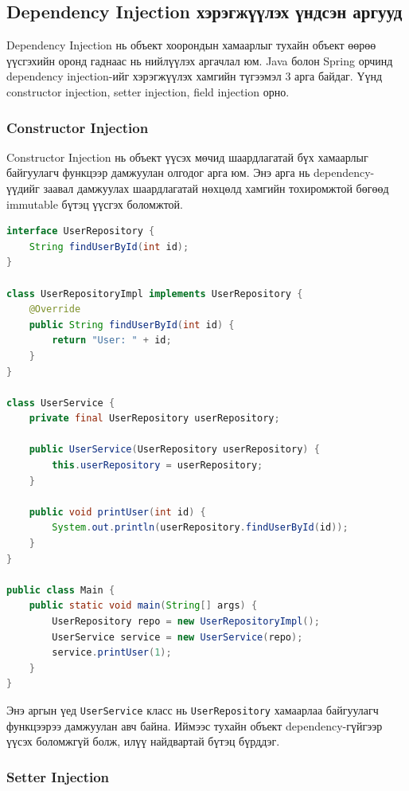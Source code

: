 \subsection{Dependency Injection хэрэгжүүлэх үндсэн аргууд}

Dependency Injection нь объект хоорондын хамаарлыг тухайн объект өөрөө үүсгэхийн оронд гаднаас нь нийлүүлэх аргачлал юм. Java болон Spring орчинд dependency injection-ийг хэрэгжүүлэх хамгийн түгээмэл 3 арга байдаг. Үүнд constructor injection, setter injection, field injection орно.

\subsubsection{Constructor Injection}

Constructor Injection нь объект үүсэх мөчид шаардлагатай бүх хамаарлыг байгуулагч функцээр дамжуулан олгодог арга юм. Энэ арга нь dependency-үүдийг заавал дамжуулах шаардлагатай нөхцөлд хамгийн тохиромжтой бөгөөд immutable бүтэц үүсгэх боломжтой.

\begin{lstlisting}[language=Java, caption={Constructor Injection жишээ}, label={lst:constructor-injection}]
interface UserRepository {
    String findUserById(int id);
}

class UserRepositoryImpl implements UserRepository {
    @Override
    public String findUserById(int id) {
        return "User: " + id;
    }
}

class UserService {
    private final UserRepository userRepository;

    public UserService(UserRepository userRepository) {
        this.userRepository = userRepository;
    }

    public void printUser(int id) {
        System.out.println(userRepository.findUserById(id));
    }
}

public class Main {
    public static void main(String[] args) {
        UserRepository repo = new UserRepositoryImpl();
        UserService service = new UserService(repo);
        service.printUser(1);
    }
}
\end{lstlisting}

Энэ аргын үед \texttt{UserService} класс нь \texttt{UserRepository} хамаарлаа байгуулагч функцээрээ дамжуулан авч байна. Иймээс тухайн объект dependency-гүйгээр үүсэх боломжгүй болж, илүү найдвартай бүтэц бүрддэг.


\newpage
\subsubsection{Setter Injection}

